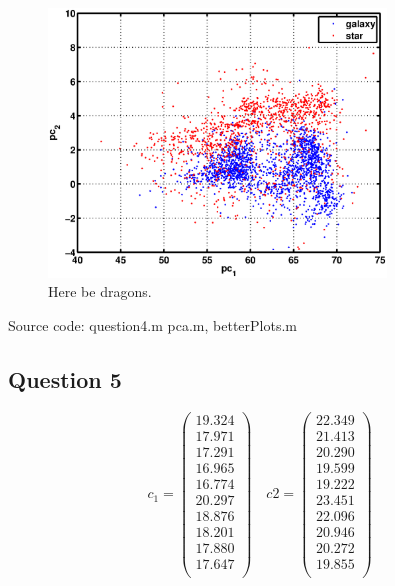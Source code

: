 \documentclass[a4paper, 11pt]{article}
\begin{document}
\begin{figure}[H]
    \centering
    \includegraphics[width=0.8\textwidth]{figures/question4_2}
    \caption{Here be dragons.}\label{fig:question4_2}
\end{figure}

Source code: question4.m pca.m, betterPlots.m

\subsection*{Question 5}

\[
    c_1 = \begin{pmatrix}
       19.324 \\
       17.971 \\
       17.291 \\
       16.965 \\
       16.774 \\
       20.297 \\
       18.876 \\
       18.201 \\
       17.880 \\
       17.647 \\
    \end{pmatrix} \quad
    c2 = \begin{pmatrix}
       22.349 \\
       21.413 \\
       20.290 \\
       19.599 \\
       19.222 \\
       23.451 \\
       22.096 \\
       20.946 \\
       20.272 \\
       19.855 \\
    \end{pmatrix}
\]
\end{document}
